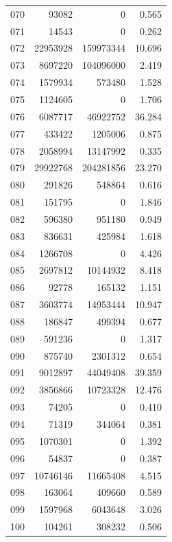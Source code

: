 \documentclass[anonymous,notoc]{gmcm2026}
\begin{document}
\begin{longtable}{lrrr}
070 & 93082 & 0 & 0.565 \\
071 & 14543 & 0 & 0.262 \\
072 & 22953928 & 159973344 & 10.696 \\
073 & 8697220 & 104096000 & 2.419 \\
074 & 1579934 & 573480 & 1.528 \\
075 & 1124605 & 0 & 1.706 \\
076 & 6087717 & 46922752 & 36.284 \\
077 & 433422 & 1205006 & 0.875 \\
078 & 2058994 & 13147992 & 0.335 \\
079 & 29922768 & 204281856 & 23.270 \\
080 & 291826 & 548864 & 0.616 \\
081 & 151795 & 0 & 1.846 \\
082 & 596380 & 951180 & 0.949 \\
083 & 836631 & 425984 & 1.618 \\
084 & 1266708 & 0 & 4.426 \\
085 & 2697812 & 10144932 & 8.418 \\
086 & 92778 & 165132 & 1.151 \\
087 & 3603774 & 14953444 & 10.947 \\
088 & 186847 & 499394 & 0.677 \\
089 & 591236 & 0 & 1.317 \\
090 & 875740 & 2301312 & 0.654 \\
091 & 9012897 & 44049408 & 39.359 \\
092 & 3856866 & 10723328 & 12.476 \\
093 & 74205 & 0 & 0.410 \\
094 & 71319 & 344064 & 0.381 \\
095 & 1070301 & 0 & 1.392 \\
096 & 54837 & 0 & 0.387 \\
097 & 10746146 & 11665408 & 4.515 \\
098 & 163064 & 409660 & 0.589 \\
099 & 1597968 & 6043648 & 3.026 \\
100 & 104261 & 308232 & 0.506 \\
\end{longtable}
\end{document}
